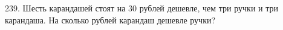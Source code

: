 239. Шесть карандашей стоят на 30 рублей дешевле, чем три ручки и три карандаша. На сколько рублей карандаш дешевле ручки?\\
